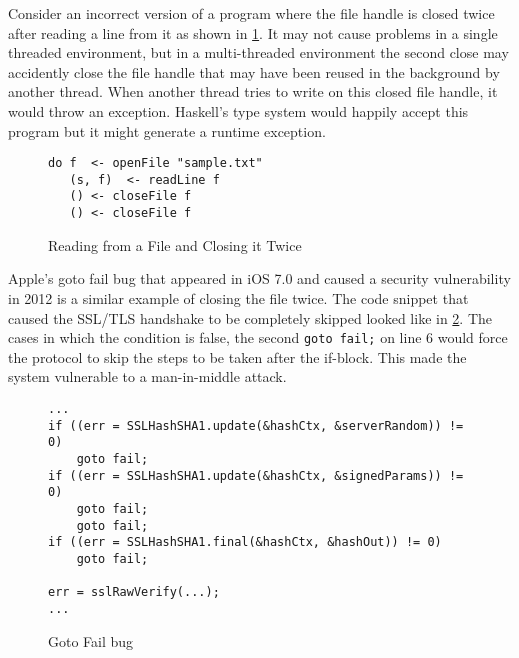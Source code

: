 Consider an incorrect version of a program where the file handle is closed twice after reading a line from it as shown in \cref{fig:file-read-close-2times}.
It may not cause problems in a single threaded environment, but in a multi-threaded environment
the second close may accidently close the file handle that may have been reused in the background by another thread.
When another thread tries to write on this closed file handle, it would throw an exception.
Haskell's type system would happily accept this program but it might generate a runtime exception.
\begin{figure}[h]
  \begin{framed}
    \begin{verbatim}
do f  <- openFile "sample.txt"
   (s, f)  <- readLine f
   () <- closeFile f
   () <- closeFile f
    \end{verbatim}
  \end{framed}
  \caption{Reading from a File and Closing it Twice}
  \label{fig:file-read-close-2times}
\end{figure}

Apple's goto fail bug that appeared in iOS 7.0 and caused a security vulnerability in 2012 is a similar example of closing the file twice.
The code snippet that caused the SSL/TLS handshake to be completely skipped looked like in \cref{fig:goto-fail}.
The cases in which the condition is false, the second \texttt{goto fail;} on line 6 would force the protocol to skip the
steps to be taken after the if-block. This made the system vulnerable to a man-in-middle attack.
\begin{figure}[h]
  \begin{framed}
\begin{verbatim}
...
if ((err = SSLHashSHA1.update(&hashCtx, &serverRandom)) != 0)
    goto fail;
if ((err = SSLHashSHA1.update(&hashCtx, &signedParams)) != 0)
    goto fail;
    goto fail;
if ((err = SSLHashSHA1.final(&hashCtx, &hashOut)) != 0)
    goto fail;

err = sslRawVerify(...);
...
\end{verbatim}
  \end{framed}
  \caption{Goto Fail bug}
  \label{fig:goto-fail}
\end{figure}

